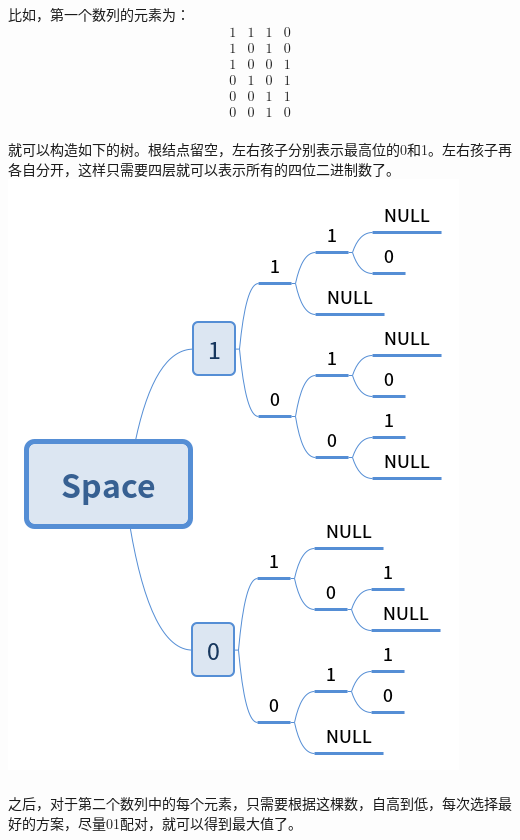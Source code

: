 \documentclass[UTF-8, 12pt]{ctexart}
\begin{document}
    \paragraph{}
    比如，第一个数列的元素为：
    \begin{equation}
        \begin{array}{cccc}
            1 & 1 & 1 & 0 \\
            1 & 0 & 1 & 0 \\
            1 & 0 & 0 & 1 \\
            0 & 1 & 0 & 1 \\
            0 & 0 & 1 & 1 \\
            0 & 0 & 1 & 0
        \end{array}
    \end{equation}
    \paragraph{}
    就可以构造如下的树。根结点留空，左右孩子分别表示最高位的0和1。左右孩子再各自分开，这样只需要四层就可以表示所有的四位二进制数了。
    \centering\includegraphics[width = .7\textwidth]{Tree.png}\\
    \paragraph{}
    \paragraph{}
    之后，对于第二个数列中的每个元素，只需要根据这棵数，自高到低，每次选择最好的方案，尽量01配对，就可以得到最大值了。
\end{document}
